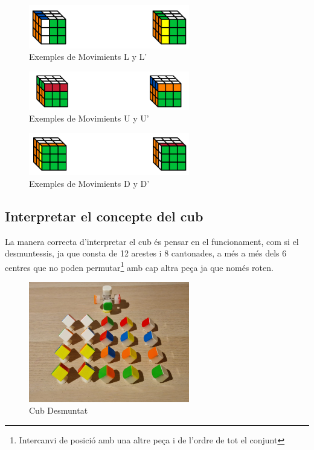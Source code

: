 \begin{figure}[!ht]
    \centering
    \includegraphics[width=7cm]{img/cubes/moviment-L.png}
    \caption{Exemples de Movimients L y L'}
\end{figure}

\begin{figure}[!ht]
    \centering
    \includegraphics[width=7cm]{img/cubes/moviment-U.png}
    \caption{Exemples de Movimients U y U'}
\end{figure}

\begin{figure}[!ht]
    \centering
    \includegraphics[width=7cm]{img/cubes/moviment-F.png}
    \caption{Exemples de Movimients D y D'}
\end{figure}

\subsection{Interpretar el concepte del cub}

La manera correcta d'interpretar el cub és pensar en el funcionament, com si el desmuntessis, ja que consta de 12 arestes i 8 cantonades, a més a més dels 6 centres que no poden permutar\footnote{Intercanvi de posició amb una altre peça i de l'ordre de tot el conjunt} amb cap altra peça ja que només roten.

\begin{figure}[h!]
    \centering
    \includegraphics[width=7cm]{img/figures/cub-desmontat.jpg}
    \caption{Cub Desmuntat}
    \label{fig:cub-desmuntat}
\end{figure}
